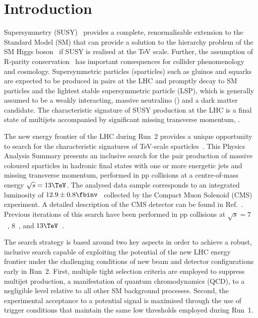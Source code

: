 \section{Introduction}
\label{sec:introduction}

Supersymmetry (SUSY)~\cite{ref:SUSY-1, ref:SUSY0, ref:SUSY1,
  ref:SUSY2, ref:SUSY3, ref:SUSY4, ref:hierarchy1, ref:hierarchy2}
provides a complete, renormalisable extension to the Standard Model
(SM) that can provide a solution to the hierarchy problem of the SM
Higgs boson~\cite{ref:atlashiggsdiscovery, ref:cmshiggsdiscovery} if
SUSY is realised at the TeV scale. Further, the assumption of R-parity
conservation~\cite{Farrar:1978xj} has important consequences for
collider phenomenology and cosmology. Supersymmetric particles
(sparticles) such as gluinos and squarks are expected to be produced
in pairs at the LHC and promptly decay to SM particles and the
lightest stable supersymmetric particle (LSP), which is generally
assumed to be a weakly interacting, massive neutralino (\chiz) and a
dark matter candidate. The characteristic signature of SUSY production
at the LHC is a final state of multijets accompanied by significant
missing transverse momentum, \ptvecmiss.

The new energy frontier of the LHC during Run~2 provides a unique
opportunity to search for the characteristic signatures of TeV-scale
sparticles~\cite{atlas-12, atlas-13, cms-12, cms-13}. This Physics
Analysis Summary presents an inclusive search for the pair production
of massive coloured sparticles in hadronic final states with one or
more energetic jets and missing transverse momentum, performed in pp
collisions at a centre-of-mass energy $\sqrt{s} = 13\TeV$. The
analysed data sample corresponds to an integrated luminosity of $12.9
\pm 0.8 \fbinv$~\cite{lumi} collected by the Compact Muon Solenoid
(CMS) experiment. A detailed description of the CMS detector can be
found in Ref.~\cite{ref:CMS}. Previous iterations of this search have
been performed in pp collisions at $\sqrt{s} = 7$~\cite{RA1Paper,
  RA1Paper2011, RA1Paper2011FULL}, $8$~\cite{RA1Paper2012, RA1Parked},
and $13\TeV$~\cite{RA1Paper2015}.

The search strategy is based around two key aspects in order to
achieve a robust, inclusive search capable of exploiting the potential
of the new LHC energy frontier under the challenging conditions of new
beam and detector configurations early in Run~2. First, multiple tight
selection criteria are employed to suppress multijet production, a
manifestation of quantum chromodynamics (QCD), to a negligible level
relative to all other SM background processes. Second, the
experimental acceptance to a potential signal is maximised through the
use of trigger conditions that maintain the same low thresholds
employed during Run~1.

